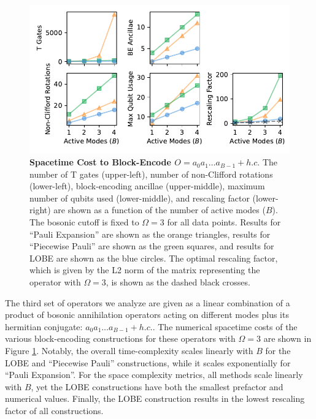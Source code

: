 \begin{figure}
    \centering
    \includegraphics[width=14cm]{figures/bosonic-hc-comparison.pdf}
    \caption{
        \textbf{Spacetime Cost to Block-Encode $O = a_0 a_1 \hdots a_{B-1} + h.c.$}
        The number of T gates (upper-left), number of non-Clifford rotations (lower-left), block-encoding ancillae (upper-middle), maximum number of qubits used (lower-middle), and rescaling factor (lower-right) are shown as a function of the number of active modes ($B$).
        The bosonic cutoff is fixed to $\Omega = 3$ for all data points.
        Results for ``Pauli Expansion'' are shown as the orange triangles, results for ``Piecewise Pauli'' are shown as the green squares, and results for LOBE are shown as the blue circles.
        The optimal rescaling factor, which is given by the L2 norm of the matrix representing the operator with $\Omega = 3$, is shown as the dashed black crosses.
    }
    \label{fig:bosonic-hc-comparison}
\end{figure}

The third set of operators we analyze are given as a linear combination of a product of bosonic annihilation operators acting on different modes plus its hermitian conjugate: $a_0 a_1 \hdots a_{B-1} + h.c.$.
The numerical spacetime costs of the various block-encoding constructions for these operators with $\Omega = 3$ are shown in Figure \ref{fig:bosonic-hc-comparison}.
Notably, the overall time-complexity scales linearly with $B$ for the LOBE and ``Piecewise Pauli'' constructions, while it scales exponentially for ``Pauli Expansion''.
For the space complexity metrics, all methods scale linearly with $B$, yet the LOBE constructions have both the smallest prefactor and numerical values.
Finally, the LOBE construction results in the lowest rescaling factor of all constructions.
